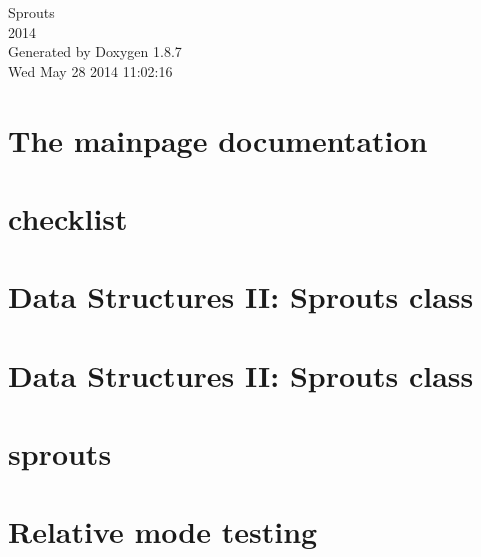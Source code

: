 \documentclass[twoside]{book}
\newcommand{\+}{\discretionary{\mbox{\scriptsize$\hookleftarrow$}}{}{}}
\newcommand{\clearemptydoublepage}{%
  \newpage{\pagestyle{empty}\cleardoublepage}%
}
\begin{document}
\hypersetup{pageanchor=false,
             bookmarks=true,
             bookmarksnumbered=true,
             pdfencoding=unicode
            }
\begin{titlepage}
\vspace*{7cm}
\begin{center}%
{\Large Sprouts \\[1ex]\large 2014 }\\
\vspace*{1cm}
{\large Generated by Doxygen 1.8.7}\\
\vspace*{0.5cm}
{\small Wed May 28 2014 11:02:16}\\
\end{center}
\end{titlepage}
\clearemptydoublepage
\tableofcontents
\clearemptydoublepage
{}
\hypersetup{pageanchor=true}

\chapter{The mainpage documentation}
\label{index}\hypertarget{index}{}
\chapter{checklist}
\label{md_checklist}
\hypertarget{md_checklist}{}

\chapter{Data Structures I\+I\+: Sprouts class}
\label{md_docs_04-24-2014}
\hypertarget{md_docs_04-24-2014}{}

\chapter{Data Structures I\+I\+: Sprouts class}
\label{md_docs_04-28-2014}
\hypertarget{md_docs_04-28-2014}{}

\chapter{sprouts}
\label{md_README}
\hypertarget{md_README}{}

\chapter{Relative mode testing}
\label{md_SDL2-2_80_83_test_relative_mode}
\hypertarget{md_SDL2-2_80_83_test_relative_mode}{}

\end{document}
